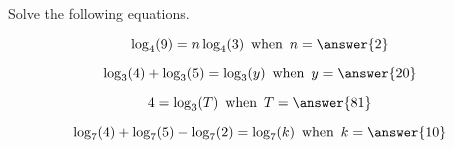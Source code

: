 \documentclass{ximera}
\author{Lee Wayand}
\begin{document}
\begin{exercise}





Solve the following equations.



\begin{question}  



\[
\log_{4}(9) = n \log_{4}(3) \, \text{ when } \, n = \answer{2}
\]


\end{question}






\begin{question}  



\[
\log_{3}(4) + \log_{3}(5) = \log_{3}(y) \, \text{ when } \, y = \answer{20}
\]


\end{question}






\begin{question}  



\[
4 = \log_{3}(T) \, \text{ when } \, T = \answer{81}
\]


\end{question}







\begin{question}  



\[
\log_{7}(4) + \log_{7}(5) - \log_{7}(2)= \log_{7}(k) \, \text{ when } \, k = \answer{10}
\]


\end{question}










\end{exercise}
\end{document}
